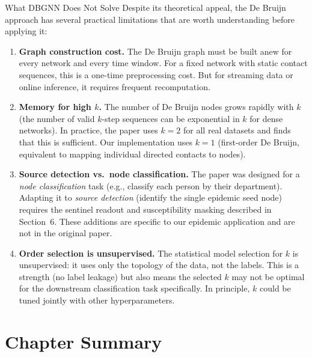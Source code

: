 \begin{keyinsight}{What DBGNN Does Not Solve}
Despite its theoretical appeal, the De Bruijn approach has several practical limitations that
are worth understanding before applying it:

\begin{enumerate}
    \item \textbf{Graph construction cost.} The De Bruijn graph must be built anew for every
          network and every time window. For a fixed network with static contact sequences, this
          is a one-time preprocessing cost. But for streaming data or online inference, it
          requires frequent recomputation.

    \item \textbf{Memory for high $k$.} The number of De Bruijn nodes grows rapidly with $k$
          (the number of valid $k$-step sequences can be exponential in $k$ for dense networks).
          In practice, the paper uses $k=2$ for all real datasets and finds that this is
          sufficient. Our implementation uses $k=1$ (first-order De Bruijn, equivalent to mapping
          individual directed contacts to nodes).

    \item \textbf{Source detection vs.\ node classification.} The paper was designed for a
          \emph{node classification} task (e.g., classify each person by their department).
          Adapting it to \emph{source detection} (identify the single epidemic seed node)
          requires the sentinel readout and susceptibility masking described in Section~6.
          These additions are specific to our epidemic application and are not in the original
          paper.

    \item \textbf{Order selection is unsupervised.} The statistical model selection for $k$
          is unsupervised: it uses only the topology of the data, not the labels. This is a
          strength (no label leakage) but also means the selected $k$ may not be optimal for
          the downstream classification task specifically. In principle, $k$ could be tuned
          jointly with other hyperparameters.
\end{enumerate}
\end{keyinsight}

\section{Chapter Summary}

